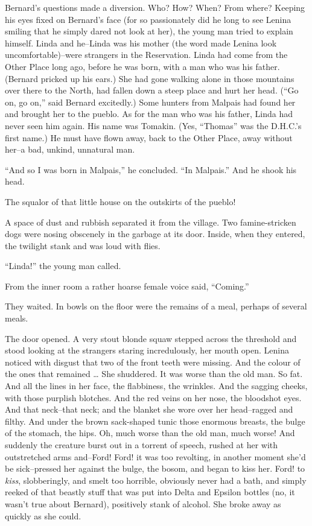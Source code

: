 \documentclass[12pt]{report}
\begin{document}
Bernard's questions made a diversion. Who? How? When? From where?
Keeping his eyes fixed on Bernard's face (for so passionately did he
long to see Lenina smiling that he simply dared not look at her), the
young man tried to explain himself. Linda and he--Linda was his mother
(the word made Lenina look uncomfortable)--were strangers in the
Reservation. Linda had come from the Other Place long ago, before he was
born, with a man who was his father. (Bernard pricked up his ears.) She
had gone walking alone in those mountains over there to the North, had
fallen down a steep place and hurt her head. (``Go on, go on,'' said
Bernard excitedly.) Some hunters from Malpais had found her and brought
her to the pueblo. As for the man who was his father, Linda had never
seen him again. His name was Tomakin. (Yes, ``Thomas'' was the D.H.C.'s
first name.) He must have flown away, back to the Other Place, away
without her--a bad, unkind, unnatural man.

``And so I was born in Malpais,'' he concluded. ``In Malpais.'' And he
shook his head.

The squalor of that little house on the outskirts of the pueblo!

A space of dust and rubbish separated it from the village. Two
famine-stricken dogs were nosing obscenely in the garbage at its door.
Inside, when they entered, the twilight stank and was loud with flies.

``Linda!'' the young man called.

From the inner room a rather hoarse female voice said, ``Coming.''

They waited. In bowls on the floor were the remains of a meal, perhaps
of several meals.

The door opened. A very stout blonde squaw stepped across the threshold
and stood looking at the strangers staring incredulously, her mouth
open. Lenina noticed with disgust that two of the front teeth were
missing. And the colour of the ones that remained \ldots{} She
shuddered. It was worse than the old man. So fat. And all the lines in
her face, the flabbiness, the wrinkles. And the sagging cheeks, with
those purplish blotches. And the red veins on her nose, the bloodshot
eyes. And that neck--that neck; and the blanket she wore over her
head--ragged and filthy. And under the brown sack-shaped tunic those
enormous breasts, the bulge of the stomach, the hips. Oh, much worse
than the old man, much worse! And suddenly the creature burst out in a
torrent of speech, rushed at her with outstretched arms and--Ford! Ford!
it was too revolting, in another moment she'd be sick--pressed her
against the bulge, the bosom, and began to kiss her. Ford! to
\emph{kiss}, slobberingly, and smelt too horrible, obviously never had a
bath, and simply reeked of that beastly stuff that was put into Delta
and Epsilon bottles (no, it wasn't true about Bernard), positively stank
of alcohol. She broke away as quickly as she could.
\end{document}

